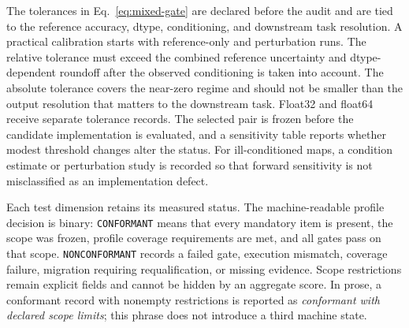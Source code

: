\documentclass[preprint,12pt,authoryear]{elsarticle}
\begin{document}
The tolerances in Eq.~\eqref{eq:mixed-gate} are declared before the audit and are tied to the reference accuracy, dtype, conditioning, and downstream task resolution. A practical calibration starts with reference-only and perturbation runs. The relative tolerance must exceed the combined reference uncertainty and dtype-dependent roundoff after the observed conditioning is taken into account. The absolute tolerance covers the near-zero regime and should not be smaller than the output resolution that matters to the downstream task. Float32 and float64 receive separate tolerance records. The selected pair is frozen before the candidate implementation is evaluated, and a sensitivity table reports whether modest threshold changes alter the status. For ill-conditioned maps, a condition estimate or perturbation study is recorded so that forward sensitivity is not misclassified as an implementation defect.

Each test dimension retains its measured status. The machine-readable profile decision is binary: \texttt{CONFORMANT} means that every mandatory item is present, the scope was frozen, profile coverage requirements are met, and all gates pass on that scope. \texttt{NONCONFORMANT} records a failed gate, execution mismatch, coverage failure, migration requiring requalification, or missing evidence. Scope restrictions remain explicit fields and cannot be hidden by an aggregate score. In prose, a conformant record with nonempty restrictions is reported as \emph{conformant with declared scope limits}; this phrase does not introduce a third machine state.
\end{document}
